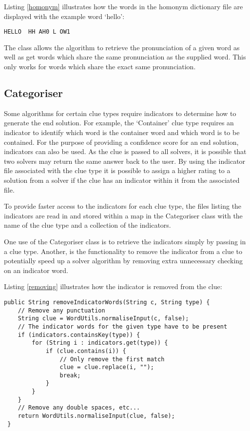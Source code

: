 Listing \ref{homonym} illustrates how the words in the homonym dictionary file 
are displayed with the example word `hello':

\begin{lstlisting}[caption={A sample of the homonym dictionary file for the word
                            `hello'}, label=homonym]  
HELLO  HH AH0 L OW1
\end{lstlisting}

The class allows the algorithm to retrieve the pronunciation of a given word as
well as  get words which share the same pronunciation as the supplied word. This
only works for words  which share the exact same pronunciation.


\subsection{Categoriser}

Some algorithms for certain clue types require indicators to determine how to
generate  the end solution. For example, the `Container' clue type requires an
indicator to identify  which word is the container word and which word is to be
contained. For the purpose of  providing a confidence score for an end solution,
indicators can also be used. As the clue  is passed to all solvers, it is
possible that two solvers may return the same answer back to the user.  By using
the indicator file associated with the clue type it is possible to assign a
higher rating  to a solution from a solver if the clue has an indicator within
it from the associated file.

To provide faster access to the indicators for each clue type, the files listing
the indicators  are read in and stored within a map in the Categoriser class
with the name of the clue type  and a collection of the indicators.

One use of the Categoriser class is to retrieve the indicators simply by passing
in a clue type.  Another, is the functionality to remove the indicator from a
clue to potentially speed up a solver  algorithm by removing extra unnecessary
checking on an indicator word.

Listing \ref{removing} illustrates how the indicator is removed from the clue:

\begin{lstlisting}[caption={Removing the indicator from the clue},
                   label=removing]  
 public String removeIndicatorWords(String c, String type) {
	// Remove any punctuation
	String clue = WordUtils.normaliseInput(c, false);
	// The indicator words for the given type have to be present
	if (indicators.containsKey(type)) {
		for (String i : indicators.get(type)) {
			if (clue.contains(i)) {
				// Only remove the first match
				clue = clue.replace(i, "");
				break;
			}
		}
	}
	// Remove any double spaces, etc...
	return WordUtils.normaliseInput(clue, false);
 }
\end{lstlisting}

